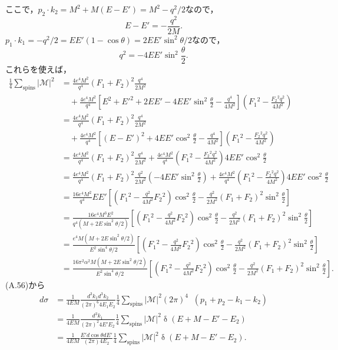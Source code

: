 ここで，$p_2 \cdot k_2 = M^2 + M(E - E') = M^2 - q^2/2$なので，
\[ E - E' = - \frac{q^2}{2M} . \]
$p_1 \cdot k_1 = -q^2/2 = EE'(1 - \cos\theta) = 2EE'\sin^2\theta/2$なので，
\[ q^2 = - 4EE'\sin^2 \frac{\theta}{2} . \]
これらを使えば，
\begin{align*}
  \frac{1}{4}\sum_\text{spins}\lvert\mathcal{M}\rvert^2 &= \frac{4e^4M^2}{q^4} (F_1 + F_2)^2  \frac{q^4}{2M^2} \\
  & \quad + \frac{4e^4M^2}{q^4} \left[ E^2 + E'^2 + 2EE' - 4EE'\sin^2 \frac{\theta}{2} - \frac{q^4}{4M^2} \right] \left( F_1{}^2 - \frac{F_2{}^2q^2}{4M^2} \right) \\
  &= \frac{4e^4M^2}{q^4} (F_1 + F_2)^2  \frac{q^4}{2M^2} \\
  & \quad + \frac{4e^4M^2}{q^4} \left[ (E - E')^2 + 4EE'\cos^2 \frac{\theta}{2} - \frac{q^4}{4M^2} \right] \left( F_1{}^2 - \frac{F_2{}^2q^2}{4M^2} \right) \\
  &= \frac{4e^4M^2}{q^4} (F_1 + F_2)^2  \frac{q^4}{2M^2} + \frac{4e^4M^2}{q^4} \left( F_1{}^2 - \frac{F_2{}^2q^2}{4M^2} \right) 4EE'\cos^2 \frac{\theta}{2} \\
  &= \frac{4e^4M^2}{q^4} (F_1 + F_2)^2  \frac{q^2}{2M^2} \left( - 4EE'\sin^2 \frac{\theta}{2} \right)+ \frac{4e^4M^2}{q^4} \left( F_1{}^2 - \frac{F_2{}^2q^2}{4M^2} \right) 4EE'\cos^2 \frac{\theta}{2} \\
  &= \frac{16e^4M^2}{q^4}EE' \left[ \left( F_1{}^2 - \frac{q^2}{4M^2} F_2{}^2 \right) \cos^2 \frac{\theta}{2} - \frac{q^2}{2M^2} (F_1 + F_2)^2 \sin^2 \frac{\theta}{2} \right] \\
  &= \frac{16e^4M^3E^2}{q^4(M + 2E\sin^2\theta/2)} \left[ \left( F_1{}^2 - \frac{q^2}{4M^2} F_2{}^2 \right) \cos^2 \frac{\theta}{2} - \frac{q^2}{2M^2} (F_1 + F_2)^2 \sin^2 \frac{\theta}{2} \right] \\
  &= \frac{e^4M(M + 2E\sin^2\theta/2)}{E^2 \sin^4\theta/2} \left[ \left( F_1{}^2 - \frac{q^2}{4M^2} F_2{}^2 \right) \cos^2 \frac{\theta}{2} - \frac{q^2}{2M^2} (F_1 + F_2)^2 \sin^2 \frac{\theta}{2} \right] \\
  &= \frac{16\pi^2 \alpha^2 M(M + 2E\sin^2\theta/2)}{E^2 \sin^4\theta/2} \left[ \left( F_1{}^2 - \frac{q^2}{4M^2} F_2{}^2 \right) \cos^2 \frac{\theta}{2} - \frac{q^2}{2M^2} (F_1 + F_2)^2 \sin^2 \frac{\theta}{2} \right] .
\end{align*}
(A.56)から
\begin{align*}
  d\sigma &= \frac{1}{4EM} \frac{d^3k_1d^3k_2}{(2\pi)^6 4E_1 E_2} \frac{1}{4}\sum_\text{spins}\lvert\mathcal{M}\rvert^2 (2\pi)^4 \mathop{\delta^{(4)}}(p_1 + p_2 - k_1 - k_2) \\
  &= \frac{1}{4EM} \frac{d^3k_1}{(2\pi)^2 4E' E_2} \frac{1}{4}\sum_\text{spins}\lvert\mathcal{M}\rvert^2 \mathop\delta (E + M - E' - E_2) \\
  &= \frac{1}{4EM} \frac{E' d\cos\theta dE'}{(2\pi) 4 E_2} \frac{1}{4}\sum_\text{spins}\lvert\mathcal{M}\rvert^2 \mathop\delta (E + M - E' - E_2) .
\end{align*}
